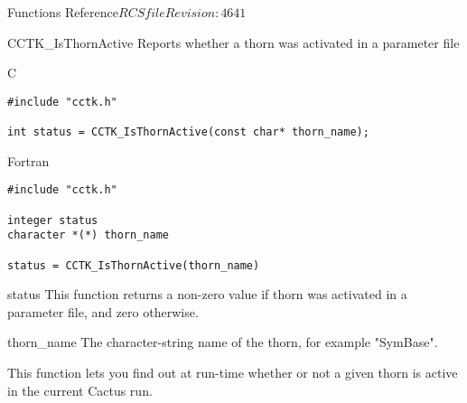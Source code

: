 \begin{cactuspart}{ Functions Reference}{$RCSfile$}{$Revision: 4641 $}
\begin{FunctionDescription}{CCTK\_IsThornActive}
\label{CCTK-IsThornActive}
Reports whether a thorn was activated in a parameter file

\begin{SynopsisSection}
\begin{Synopsis}{C}
\begin{verbatim}
#include "cctk.h"

int status = CCTK_IsThornActive(const char* thorn_name);
\end{verbatim}
\end{Synopsis}
\begin{Synopsis}{Fortran}
\begin{verbatim}
#include "cctk.h"

integer status
character *(*) thorn_name

status = CCTK_IsThornActive(thorn_name)
\end{verbatim}
\end{Synopsis}
\end{SynopsisSection}

\begin{ResultSection}
\begin{Result}{status}
This function returns a non-zero value if thorn
 was activated in a parameter file,
and zero otherwise.
\end{Result}
\end{ResultSection}

\begin{ParameterSection}
\begin{Parameter}{thorn\_name}
The character-string name of the thorn, for example "SymBase".
\end{Parameter}
\end{ParameterSection}

\begin{Discussion}
This function lets you find out at run-time whether or not a given
thorn is active in the current Cactus run.
\end{Discussion}

\end{FunctionDescription}


\end{cactuspart}
